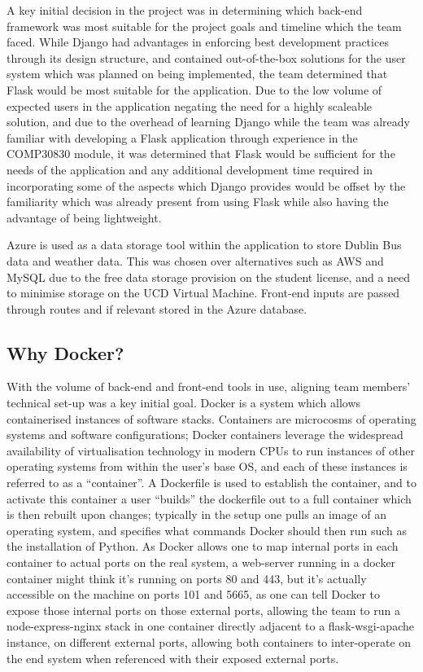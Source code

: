 \documentclass[]{UCD_CS_47360_Report}
\begin{document}
A key initial decision in the project was in determining which back-end framework was most suitable for the project goals and timeline which the team faced. While Django had advantages in enforcing best development practices through its design structure, and contained out-of-the-box solutions for the user system which was planned on being implemented, the team determined that Flask would be most suitable for the application. Due to the low volume of expected users in the application negating the need for a highly scaleable solution, and due to the overhead of learning Django while the team was already familiar with developing a Flask application through experience in the COMP30830 module, it was determined that Flask would be sufficient for the needs of the application and any additional development time required in incorporating some of the aspects which Django provides would be offset by the familiarity which was already present from using Flask while also having the advantage of being lightweight.

Azure is used as a data storage tool within the application to store Dublin Bus data and weather data. This was chosen over alternatives such as AWS and MySQL due to the free data storage provision on the student license, and a need to minimise storage on the UCD Virtual Machine. Front-end inputs are passed through routes and if relevant stored in the Azure database. 

\subsection{Why Docker?}

With the volume of back-end and front-end tools in use, aligning team members' technical set-up was a key initial goal. Docker is a system which allows containerised instances of software stacks. Containers are microcosms of operating systems and software configurations; Docker containers leverage the widespread availability of virtualisation technology in modern CPUs to run instances of other operating systems from within the user's base OS, and each of these instances is referred to as a “container”. A Dockerfile is used to establish the container, and to activate this container a user “builds” the dockerfile out to a full container which is then rebuilt upon changes; typically in the setup one pulls an image of an operating system, and specifies what commands Docker should then run such as the installation of Python. As Docker allows one to map internal ports in each container to actual ports on the real system, a web-server running in a docker container might think it’s running on ports 80 and 443, but it’s actually accessible on the machine on ports 101 and 5665, as one can tell Docker to expose those internal ports on those external ports, allowing the team to run a node-express-nginx stack in one container directly adjacent to a flask-wsgi-apache instance, on different external ports, allowing both containers to inter-operate on the end system when referenced with their exposed external ports.
\end{document}
